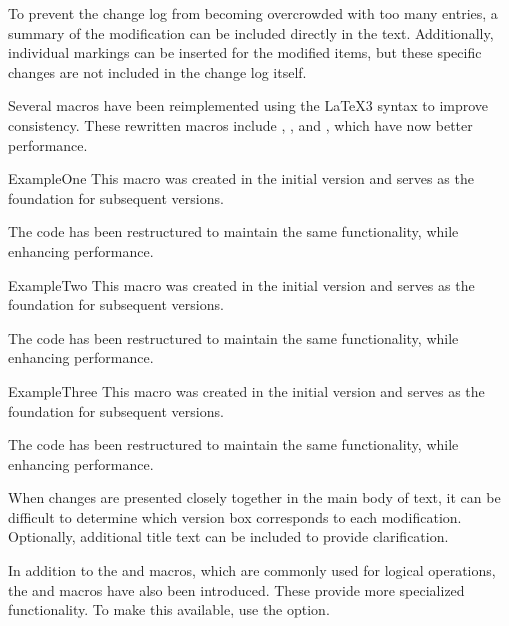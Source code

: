 \documentclass[a4paper, 11pt]{article}
\begin{document}
To prevent the change log from becoming overcrowded with too many entries, a summary of the modification can be included directly in the text. Additionally, individual markings can be inserted for the modified items, but these specific changes are not included in the change log itself.

\begin{DocsExample}
    Several macros have been reimplemented using the \LaTeX 3 syntax to improve consistency. These rewritten macros include , , and , which have now better performance.

    \begin{Macro*}{ExampleOne}{}{}
        This macro was created in the initial version and serves as the foundation for subsequent versions.

        The code has been restructured to maintain the same functionality, while enhancing performance.
    \end{Macro*}

    \begin{Macro*}{ExampleTwo}{}{}
        This macro was created in the initial version and serves as the foundation for subsequent versions.

        The code has been restructured to maintain the same functionality, while enhancing performance.
    \end{Macro*}

    \begin{Macro*}{ExampleThree}{}{}
        This macro was created in the initial version and serves as the foundation for subsequent versions.

        The code has been restructured to maintain the same functionality, while enhancing performance.
    \end{Macro*}
\end{DocsExample}

When changes are presented closely together in the main body of text, it can be difficult to determine which version box corresponds to each modification. Optionally, additional title text can be included to provide clarification.

\begin{DocsExample}
    In addition to the  and  macros, which are commonly used for logical operations, the  and  macros have also been introduced. These provide more specialized functionality. To make this available, use the  option.
\end{DocsExample}
\end{document}
